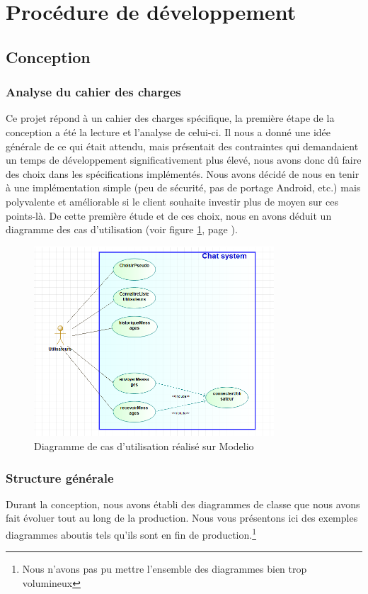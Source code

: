 \documentclass[12pt, a4paper]{article}
\begin{document}
    
    \newpage
    \section{Procédure de développement}
    \subsection{Conception}
    \subsubsection{Analyse du cahier des charges}
    Ce projet répond à un cahier des charges spécifique, la première étape de la conception a été la lecture et l'analyse de celui-ci. Il nous a donné une idée générale de ce qui était attendu, mais présentait des contraintes qui demandaient un temps de développement significativement plus élevé, nous avons donc dû faire des choix dans les spécifications implémentés. Nous avons décidé de nous en tenir à une implémentation simple (peu de sécurité, pas de portage Android, etc.) mais polyvalente et améliorable si le client souhaite investir plus de moyen sur ces points-là. De cette première étude et de ces choix, nous en avons déduit un diagramme des cas d'utilisation (voir figure \ref{ucd}, page \pageref{ucd}).\\
    
    \begin{figure}[!ht]
        \centering
        \includegraphics[width=0.8\textwidth]{img/usecases.png}
        \caption{Diagramme de cas d'utilisation réalisé sur Modelio}
        \label{ucd}
    \end{figure}
    
    \subsubsection{Structure générale}
    Durant la conception, nous avons établi des diagrammes de classe que nous avons fait évoluer tout au long de la production. Nous vous présentons ici des exemples diagrammes aboutis tels qu'ils sont en fin de production.\footnote{Nous n'avons pas pu mettre l'ensemble des diagrammes bien trop volumineux}
    
\end{document}
